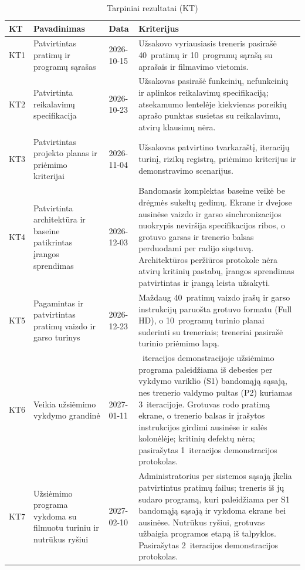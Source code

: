 \begin{table}[H]
  \centering
  \caption{Tarpiniai rezultatai (KT)}
  \label{tab:kt}
  \small
  \begin{tabularx}{\textwidth}{@{}l>{\raggedright\arraybackslash}p{}l>{\raggedright\arraybackslash}X@{}}
    \toprule
    \textbf{KT} & \textbf{Pavadinimas} & \textbf{Data} & \textbf{Kriterijus} \\
    \midrule
    KT1 & Patvirtintas pratimų ir programų sąrašas & 2026-10-15 & Užsakovo vyriausiasis treneris pasirašė 40~pratimų ir 10~programų sąrašą su aprašais ir filmavimo vietomis. \\
    KT2 & Patvirtinta reikalavimų specifikacija & 2026-10-23 & Užsakovas pasirašė funkcinių, nefunkcinių ir aplinkos reikalavimų specifikaciją; atsekamumo lentelėje kiekvienas poreikių aprašo punktas susietas su reikalavimu, atvirų klausimų nėra. \\
    KT3 & Patvirtintas projekto planas ir priėmimo kriterijai & 2026-11-04 & Užsakovas patvirtino tvarkaraštį, iteracijų turinį, rizikų registrą, priėmimo kriterijus ir demonstravimo scenarijus. \\
    KT4 & Patvirtinta architektūra ir baseine patikrintas įrangos sprendimas & 2026-12-03 & Bandomasis komplektas baseine veikė be drėgmės sukeltų gedimų. Ekrane ir dvejose ausinėse vaizdo ir garso sinchronizacijos nuokrypis neviršija specifikacijos ribos, o grotuvo garsas ir trenerio balsas perduodami per radijo siųstuvą. Architektūros peržiūros protokole nėra atvirų kritinių pastabų, įrangos sprendimas patvirtintas ir įrangą leista užsakyti. \\
    KT5 & Pagamintas ir patvirtintas pratimų vaizdo ir garso turinys & 2026-12-23 & Maždaug 40~pratimų vaizdo įrašų ir garso instrukcijų paruošta grotuvo formatu (Full HD), o 10~programų turinio planai suderinti su treneriais; treneriai pasirašė turinio priėmimo lapą. \\
    KT6 & Veikia užsiėmimo vykdymo grandinė & 2027-01-11 & 1~iteracijos demonstracijoje užsiėmimo programa paleidžiama iš debesies per vykdymo variklio (S1) bandomąją sąsają, nes trenerio valdymo pultas (P2) kuriamas 3~iteracijoje. Grotuvas rodo pratimą ekrane, o trenerio balsas ir įrašytos instrukcijos girdimi ausinėse ir salės kolonėlėje; kritinių defektų nėra; pasirašytas 1~iteracijos demonstracijos protokolas. \\
    KT7 & Užsiėmimo programa vykdoma su filmuotu turiniu ir nutrūkus ryšiui & 2027-02-10 & Administratorius per sistemos sąsają įkelia patvirtintus pratimų failus; treneris iš jų sudaro programą, kuri paleidžiama per S1 bandomąją sąsają ir vykdoma ekrane bei ausinėse. Nutrūkus ryšiui, grotuvas užbaigia programos etapą iš talpyklos. Pasirašytas 2~iteracijos demonstracijos protokolas. \\

\end{tabularx}
\end{table}
